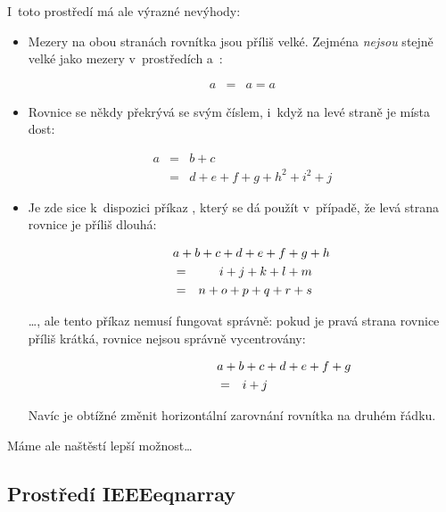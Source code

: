 I~toto prostředí má ale výrazné nevýhody:
\begin{itemize}
\item Mezery na obou stranách rovnítka jsou příliš velké.
  Zejména \emph{nejsou} stejně velké jako mezery v~prostředích
   a~:
\begin{example}
\begin{eqnarray}
  a & = & a = a
\end{eqnarray}
\end{example}

\item Rovnice se někdy překrývá se svým číslem,
i~když na levé straně je místa dost:
\begin{example}
\begin{eqnarray}
  a & = & b + c \\
  & = & d + e + f + g + h^2 
  + i^2 + j 
  \label{eq:faultyeqnarray}
\end{eqnarray}
\end{example}

\item Je zde sice k~dispozici příkaz , který se dá
  použít v~případě, že levá strana rovnice je příliš dlouhá:
\begin{example}
\begin{eqnarray}
  \lefteqn{a + b + c + d 
    + e + f + g + h}\nonumber\\
  & = & i + j + k + l + m \\
  & = & n + o + p + q + r + s
\end{eqnarray}
\end{example}
\ldots, ale tento příkaz nemusí fungovat správně: pokud je pravá
strana rovnice příliš krátká, rovnice nejsou správně vycentrovány:
\begin{example}
\begin{eqnarray}
  \lefteqn{a + b + c + d 
    + e + f + g} 
  \nonumber \\
  & = & i + j 
\end{eqnarray}
\end{example}
Navíc je obtížné změnit horizontální zarovnání rovnítka
na druhém řádku.
\end{itemize}

Máme ale naštěstí lepší možnost\ldots


\subsection{Prostředí IEEEeqnarray}
\label{sec:IEEEeqnarray_intro}

